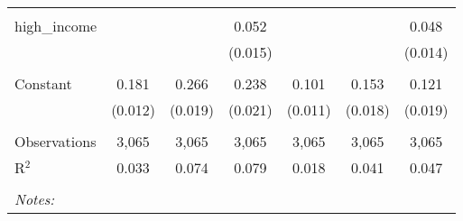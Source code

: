 \begin{table}[!htbp]
\begin{tabular}{@{\extracolsep{5pt}}lcccccc}
  & & & & & & \\ 
 high\_income &  &  & 0.052 &  &  & 0.048 \\ 
  &  &  & (0.015) &  &  & (0.014) \\ 
  & & & & & & \\ 
 Constant & 0.181 & 0.266 & 0.238 & 0.101 & 0.153 & 0.121 \\ 
  & (0.012) & (0.019) & (0.021) & (0.011) & (0.018) & (0.019) \\ 
  & & & & & & \\ 
Observations & 3,065 & 3,065 & 3,065 & 3,065 & 3,065 & 3,065 \\ 
R$^{2}$ & 0.033 & 0.074 & 0.079 & 0.018 & 0.041 & 0.047 \\ 
\hline \\[-1.8ex] 
\textit{Notes:} & \multicolumn{6}{l}{} \\ 
\end{tabular} 
\end{table} 
